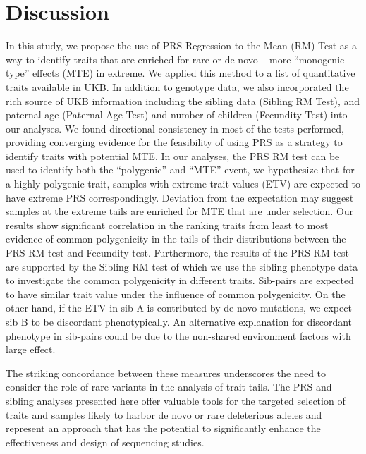 \documentclass[times]{zHenriquesLab-StyleBioRxiv}
\begin{document}
%
%
%
\clearpage \newpage
\section*{Discussion} \label{sec:discussion} In this study, we propose
the use of PRS Regression-to-the-Mean (RM) Test as a way to identify
traits that are enriched for rare or de novo – more “monogenic-type”
effects (MTE) in extreme.  We applied this method to a list of
quantitative traits available in UKB. In addition to genotype data, we
also incorporated the rich source of UKB information including the
sibling data (Sibling RM Test), and paternal age (Paternal Age Test)
and number of children (Fecundity Test) into our analyses.  We found
directional consistency in most of the tests performed, providing
converging evidence for the feasibility of using PRS as a strategy to
identify traits with potential MTE.  In our analyses, the PRS RM test
can be used to identify both the “polygenic” and “MTE” event, we
hypothesize that for a highly polygenic trait, samples with extreme
trait values (ETV) are expected to have extreme PRS
correspondingly. Deviation from the expectation may suggest samples at
the extreme tails are enriched for MTE that are under selection. Our
results show significant correlation in the ranking traits from least
to most evidence of common polygenicity in the tails of their
distributions between the PRS RM test and Fecundity test. Furthermore,
the results of the PRS RM test are supported by the Sibling RM test of
which we use the sibling phenotype data to investigate the common
polygenicity in different traits.  Sib-pairs are expected to have
similar trait value under the influence of common polygenicity. On the
other hand, if the ETV in sib A is contributed by de novo mutations,
we expect sib B to be discordant phenotypically. An alternative
explanation for discordant phenotype in sib-pairs could be due to the
non-shared environment factors with large effect.

The striking concordance between these measures underscores the need
to consider the role of rare variants in the analysis of trait tails.
The PRS and sibling analyses presented here offer valuable tools for
the targeted selection of traits and samples likely to harbor de novo
or rare deleterious alleles and represent an approach that has the
potential to significantly enhance the effectiveness and design of
sequencing studies.
\end{document}
